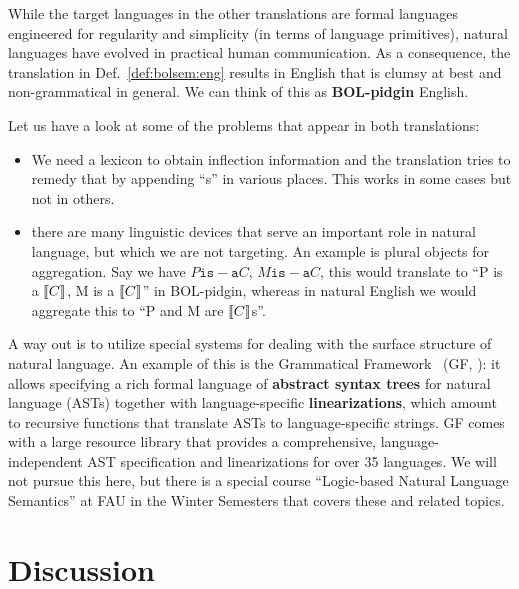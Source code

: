 \begin{remark}
While the target languages in the other translations are formal languages engineered for regularity and simplicity (in terms of language primitives), natural languages have evolved in practical human communication.
As a consequence, the translation in Def.~\ref{def:bolsem:eng} results in English that is clumsy at best and non-grammatical in general.
We can think of this as \textbf{BOL-pidgin} English.

Let us have a look at some of the problems that appear in both translations:
\begin{itemize}
\item We need a lexicon to obtain inflection information and the translation tries to remedy that by appending ``s'' in various places.
This works in some cases but not in others.
\item there are many linguistic devices that serve an important role in natural language, but which we are not targeting.
An example is plural objects for aggregation.
Say we have $P \mathtt{is-a} C$, $M \mathtt{is-a} C$, this would translate to ``P is a $\llbracket C\rrbracket$, M is a $\llbracket C\rrbracket$'' in BOL-pidgin, whereas in natural English we would aggregate this to ``P and M are $\llbracket C\rrbracket$s''.
\end{itemize}

A way out is to utilize special systems for dealing with the surface structure of natural language.
An example of this is the Grammatical Framework~ (GF, \cite{gf}): it allows specifying a rich formal language of \textbf{abstract syntax trees} for natural language (ASTs) together with language-specific \textbf{linearizations}, which amount to recursive functions that translate ASTs to language-specific strings.
GF comes with  a large resource library that provides a comprehensive, language-independent AST specification and linearizations for over 35 languages.
We will not pursue this here, but there is a special course ``Logic-based Natural Language Semantics'' at FAU in the Winter Semesters that covers these and related topics.
\end{remark}

\section{Discussion}

